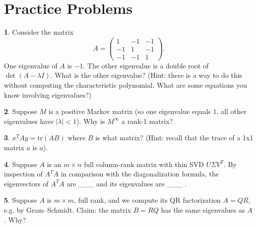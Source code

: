 \documentclass{article}
\theoremstyle{definition}
\newtheorem{prob}{}
\begin{document}
\section*{Practice Problems}
\begin{prob}
	Consider the matrix
	\[A= \begin{pmatrix}
		1 & -1 & -1\\-1&1&-1\\-1&-1&1
	\end{pmatrix}.\]
One eigenvalue of $A$ is $-1$. The other eigenvalue is a double root of $\det(A-\lambda I)$. What is the other eigenvalue? (Hint: there is a way to do this without computing the characteristic polynomial. What are some equations you know involving eigenvalues?)
\end{prob}


\begin{prob}
Suppose $M$ is a positive Markov matrix (so one eigenvalue equals $1$, all other eigenvalues have $|\lambda|<1$).  Why is $M^\infty$ a rank-1 matrix?
\end{prob}


\begin{prob}
	$x^T A y = \text{tr}(A B)$ where $B$ is what matrix?   (Hint: recall that the trace of a 1x1 matrix $a$ is $a$).
\end{prob}


\begin{prob}

Suppose $A$ is an $m \times n$ full column-rank matrix with thin SVD $U\Sigma V^T$.   By inspection of $A^T A$ in comparison with the diagonalization formula, the eigenvectors of $A^T A$ are \_\_\_ and its eigenvalues are \_\_\_ .
\end{prob}



\begin{prob}
	Suppose $A$ is $m \times m$, full rank, and we compute its QR factorization $A=QR$, e.g. by Gram–Schmidt.   Claim: the matrix $B=RQ$ has the same eigenvalues as $A$.  Why?
\end{prob}
\end{document}
